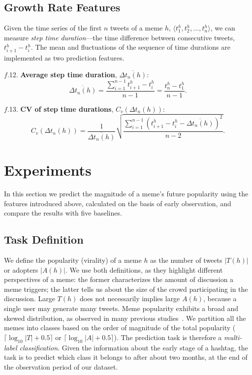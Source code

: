 \documentclass[letterpaper]{article}
\begin{document}
\subsection{Growth Rate Features}

Given the time series of the first $n$ tweets of a meme $h$, $\langle t_1^h,
t_2^h, \dots, t_n^h \rangle$, we can measure \emph{step time duration}---the
time difference between consecutive tweets, $t_{i+1}^h - t_i^h$. The mean
and fluctuations of the sequence of time durations are implemented as two prediction
features.

\noindent $f$.12. \textbf{Average step time duration}, $\overline{\Delta t_n(h)}$:
\begin{equation*}
\overline{\Delta t_n(h)} = \frac{\sum_{i=1}^{n-1} t_{i+1}^h - t_i^h}{n-1}  =
\frac{t^h_n - t^h_1}{n-1}.
\end{equation*}

\noindent $f$.13. \textbf{CV of step time durations}, $C_v(\Delta t_n(h))$:
\begin{equation*}
C_v(\Delta t_n(h)) = \frac{1}{\overline{\Delta
t_n(h)}}\sqrt{\frac{\sum_{i=1}^{n-1} (t_{i+1}^h - t_i^h - \overline{\Delta
t_n(h)})^2}{n-2}}.
\end{equation*}



\section{Experiments}
\label{sec:exp}

In this section we predict the magnitude of a meme's future popularity using the features introduced above, calculated on the basis of early observation, and compare the results with five baselines.

\subsection{Task Definition}

We define the popularity (virality) of a meme $h$ as the number of tweets $|T(h)|$ or adopters $|A(h)|$. We use both definitions, as they highlight different perspectives of a meme: the former characterizes the amount of discussion a meme triggers; the latter tells us about the size of the crowd participating in the discussion.  Large $T(h)$ does not necessarily implies large $A(h)$, because a single user may generate many tweets.
Meme popularity exhibits a broad and skewed distribution, as observed in many previous studies~\cite{Lerman:ICWSM2010,Weng:2012scirep}. We partition all the memes into classes based on the order of magnitude of the total popularity ($\lceil \log_{10} |T| + 0.5 \rceil$ or $\lceil \log_{10} |A| + 0.5 \rceil$).
The prediction task is therefore a \emph{multi-label classification}. Given the information about the early stage of a hashtag, the task is to predict which class it belongs to after about two months, at the end of the observation period of our dataset.
\end{document}
